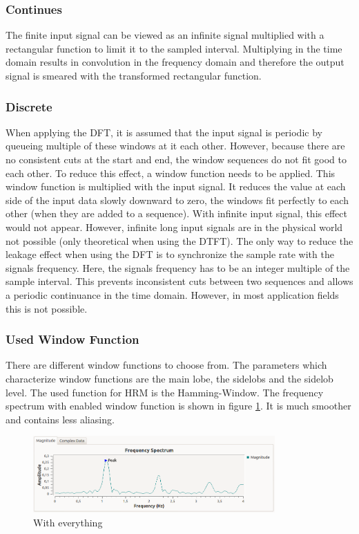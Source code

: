 \documentclass[notitlepage]{scrreprt}
\begin{document}
\subsubsection{Continues}
The finite input signal can be viewed as an infinite signal multiplied with a rectangular function to limit it to the sampled interval. Multiplying in the time domain results in convolution in the frequency domain and therefore the output signal is smeared with the transformed rectangular function.

\subsubsection{Discrete}
When applying the DFT, it is assumed that the input signal is periodic by queueing multiple of these windows at it each other. However, because there are no consistent cuts at the start and end, the window sequences do not fit good to each other. To reduce this effect, a window function needs to be applied. This window function is multiplied with the input signal. It reduces the value at each side of the input data slowly downward to zero, the windows fit perfectly to each other (when they are added to a sequence). With infinite input signal, this effect would not appear. However, infinite long input signals are in the physical world not possible (only theoretical when using the DTFT). The only way to reduce the leakage effect when using the DFT is to synchronize the sample rate with the  signals frequency. Here, the signals frequency has to be an integer multiple of the sample interval. This prevents inconsistent cuts between two sequences and allows a periodic continuance in the time domain. However, in most application fields this is not possible.\\

\subsubsection{Used Window Function}
There are different window functions to choose from. The parameters which characterize window functions are the main lobe, the sidelobs and the sidelob level. The used function for HRM is the Hamming-Window. The frequency spectrum with enabled window function is shown in figure \ref{fig:filter-window}. It is much smoother and contains less aliasing.

\begin{figure}[H]
	\centering
	\includegraphics[width=350px]{images/withEverything.png}
	\caption{With everything}
	\label{fig:filter-window}
\end{figure}
\end{document}

